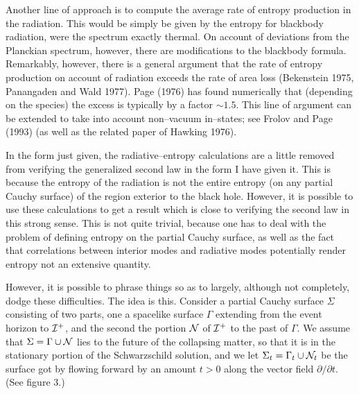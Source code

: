 Another line of approach is to compute the average rate of entropy production
in the radiation.  This would be simply be given by the entropy for blackbody
radiation, were the spectrum exactly thermal. On account of deviations from the
Planckian spectrum, however, there are modifications to the blackbody formula. 
Remarkably, however, there is a general argument that the rate of entropy
production on account of radiation exceeds the rate of area loss (Bekenstein
1975, Panangaden and Wald 1977).  Page (1976)  has found numerically that
(depending on the species) the excess is typically by a factor $\sim 1.5$. 
This line of argument can be extended to take into account non--vacuum
in--states; see Frolov and Page (1993) (as well as the related paper of Hawking
1976).

In the form just given, the radiative--entropy calculations are a little
removed from verifying the generalized second law in the form I have given it. 
This is because the entropy of the radiation is not the entire entropy (on any
partial Cauchy surface) of the region exterior to the black hole. However, it
is possible to use these calculations to get a result which is close to
verifying the second law in this strong sense. This is not quite trivial,
because one has to deal with the problem of defining entropy on the partial
Cauchy surface, as well as the fact that correlations between interior modes
and radiative modes potentially render entropy not an extensive quantity.

However, it is possible to phrase things so as to largely, although not
completely, dodge these difficulties.  The idea is this.  Consider a partial
Cauchy surface $\Sigma$ consisting of two parts, one a spacelike surface
$\Gamma$ extending from the event horizon to ${\cal I} ^+$, and the second the
portion ${\cal N}$ of ${\cal I} ^+$ to the past of $\Gamma$.  We assume that
$\Sigma =\Gamma \cup {\cal N}$ lies to the future of the collapsing matter, so
that it is in the stationary portion of the Schwarzschild solution, and we let
$\Sigma _t =\Gamma _t\cup {\cal N}_t$ be the surface got by flowing forward by
an amount $t>0$ along the vector field $\partial /\partial t$.  (See figure 3.)

\epsfysize=3in

